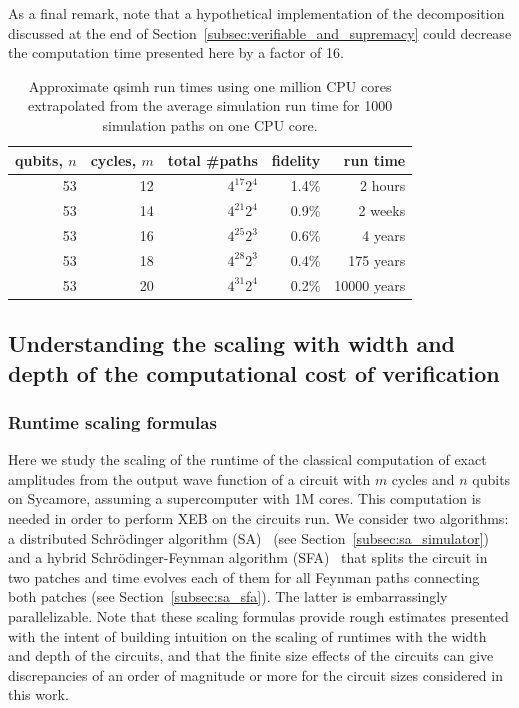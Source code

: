 As a final remark, note that a hypothetical implementation of the decomposition discussed at the end of Section~\ref{subsec:verifiable_and_supremacy} could decrease the computation time presented here by a factor of 16.

\begin{table}
\begin{tabular}{| r | r | r | r | r |}
\hline
qubits, $n$ & cycles, $m$ & total \#paths & fidelity & run time \\
\hline
53 & 12 & $4^{17} 2^4$ & 1.4\% & 2 hours \\
\hline
53 & 14 & $4^{21} 2^4$ & 0.9\% & 2 weeks \\
\hline
53 & 16 & $4^{25} 2^3$ & 0.6\% & 4 years \\
\hline
53 & 18 & $4^{28} 2^3$ & 0.4\% & 175 years \\
\hline
53 & 20 & $4^{31} 2^4$ & 0.2\% & 10000 years \\
\hline
\end{tabular}
\label{table:qsimhruntimes}
\caption{Approximate qsimh run times using one million CPU cores extrapolated from the average simulation run time for 1000 simulation paths on one CPU core.}
\end{table}


\subsection{Understanding the scaling with width and depth of the computational cost of verification}
\label{subsec:scaling}


\subsubsection{Runtime scaling formulas}
\label{subsec:scaling_formulas}

Here we study the scaling of the runtime of the classical computation of exact amplitudes from the output wave function of a circuit with $m$ cycles and $n$ qubits on Sycamore, assuming a supercomputer with 1M cores. This computation is needed in order to perform XEB on the circuits run. We consider two algorithms: a distributed Schr\"odinger algorithm (SA)~\cite{RAED07x,RAED19a} (see Section~\ref{subsec:sa_simulator}) and a hybrid Schr\"odinger-Feynman algorithm (SFA)~\cite{markov_quantum_2018} that splits the circuit in two patches and time evolves each of them for all Feynman paths connecting both patches (see Section~\ref{subsec:sa_sfa}). The latter is embarrassingly parallelizable. Note that these scaling formulas provide rough estimates presented with the intent of building intuition on the scaling of runtimes with the width and depth of the circuits, and that the finite size effects of the circuits can give discrepancies of an order of magnitude or more for the circuit sizes considered in this work.\\

